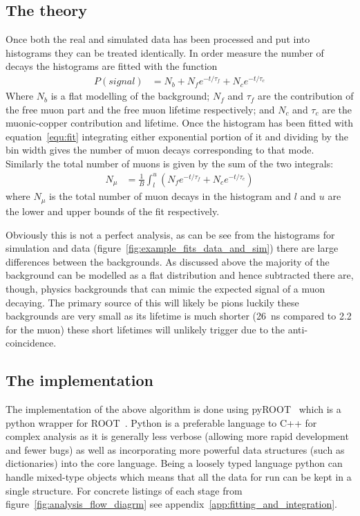 \subsection{The theory} %
\label{sub:the_theory}
Once both the real and simulated data has been processed and put into histograms they can be treated identically. In order measure the number of decays the histograms are fitted with the function 
\begin{align}
    P(signal) &= N_{b} + N_{f}e^{-t / \tau_{f}} + N_{c} e^{-t / \tau_{c}} \label{equ:fit}
\end{align}
Where $N_{b}$ is a flat modelling of the background; $N_{f}$ and $\tau_{f}$ are the contribution of the free muon part and the free muon lifetime respectively; and $N_{c}$ and $\tau_{c}$ are the muonic-copper contribution and lifetime. Once the histogram has been fitted with equation~\ref{equ:fit} integrating either exponential portion of it and dividing by the bin width gives the number of muon decays corresponding to that mode. Similarly the total number of muons is given by the sum of the two integrals:
\begin{align}
    N_{\mu} &= \frac{1}{B} \int_{l}^{u}\left(N_{f}e^{-t / \tau_{f}} + N_{c} e^{-t / \tau_{c}} \right) \label{equ:sum_exp_parts}
\end{align}
where $N_{\mu}$ is the total number of muon decays in the histogram and $l$ and $u$ are the lower and upper bounds of the fit respectively. 

Obviously this is not a perfect analysis, as can be see from the histograms for simulation and data (figure~\ref{fig:example_fits_data_and_sim}) there are large differences between the backgrounds. As discussed above the majority of the background can be modelled as a flat distribution and hence subtracted there are, though, physics backgrounds that can mimic the expected signal of a muon decaying. The primary source of this will likely be pions luckily these backgrounds are very small as its lifetime is much shorter (26~ns compared to 2.2\mus{} for the muon) these short lifetimes will unlikely trigger due to the anti-coincidence.

\subsection{The implementation} %
\label{sub:the_implementation}
The implementation of the above algorithm is done using pyROOT~\cite{lavrijsenpyroot} which is a python wrapper for ROOT~\cite{Brun199781}. Python is a preferable language to C++ for complex analysis as it is generally less verbose (allowing more rapid development and fewer bugs) as well as incorporating more powerful data structures (such as dictionaries) into the core language. Being a loosely typed language python can handle mixed-type objects which means that all the data for run can be kept in a single structure. For concrete listings of each stage from figure~\ref{fig:analysis_flow_diagrm} see appendix~\ref{app:fitting_and_integration}.

